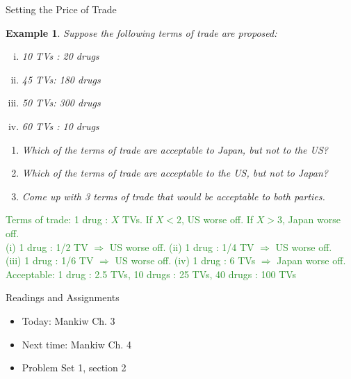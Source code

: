 \documentclass[xcolor={dvipsnames},pdf, hyperref={colorlinks=true, citecolor=ForestGreen, linkcolor=BlueViolet, urlcolor=Magenta}]{beamer}
\newtheorem{exmp}{Example}[section]
\theoremstyle{definition}
\newcommand{\ddp}[1]{{\textcolor{ForestGreen}{#1}}}
\begin{document}
\begin{frame}[t]{Setting the Price of Trade}
	\begin{exmp}
		\scriptsize
		Suppose the following terms of trade are proposed:	 
		 \begin{enumerate}[(i)]
			\item 10 TVs : 20 drugs
			\item 45 TVs: 180 drugs
			\item 50 TVs: 300 drugs
			\item 60 TVs : 10 drugs 	
		\end{enumerate}
	\begin{enumerate}
		\item Which of the terms of trade are acceptable to Japan, but not to the US?
		\item Which of the terms of trade are acceptable to the US, but not to Japan?
		\item Come up with 3 terms of trade that would be acceptable to both parties.
	\end{enumerate} 
	\end{exmp}
	\scriptsize
	\ddp{\pause Terms of trade: 1 drug : $X$ TVs. If $X<2$, US worse off. If $X>3$, Japan worse off. \\
		\pause  (i) 1 drug : 1/2 TV $\Rightarrow$ US worse off.  (ii) 1 drug : 1/4 TV $\Rightarrow$ US worse off. \\
	 (iii) 1 drug : 1/6 TV $\Rightarrow$ US worse off. (iv) 1 drug : 6 TVs $\Rightarrow$ Japan worse off. \\
	\pause	Acceptable: 1 drug : 2.5 TVs, 10 drugs : 25 TVs, 40 drugs : 100 TVs}
\end{frame}

\begin{frame}{Readings and Assignments}
	\begin{itemize}
		\item Today: Mankiw Ch. 3
		\item Next time: Mankiw Ch. 4
		\item Problem Set 1, section 2
	\end{itemize}

\end{frame}
\end{document}
